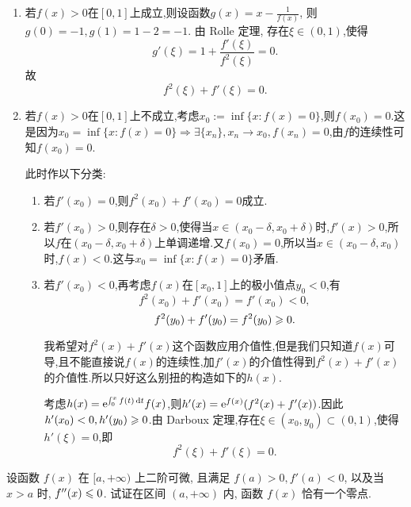 \begin{solution}

    \begin{enumerate}
        \item 若$f(x) > 0$在$[0,1]$上成立,则设函数$g(x) = x - \frac{1}{f(x)}$, 则$g(0) = -1, g(1) = 1 - 2 = -1$. 由 Rolle 定理, 存在$\xi \in (0,1)$,使得
              $$g'(\xi) = 1 + \frac{f'(\xi)}{f^2(\xi)} = 0.$$
              故
              $$f^2(\xi) + f'(\xi) = 0.$$
        \item 若$f(x) > 0 $在$[0,1]$上不成立,考虑$x_0:=\inf\{x:f(x)=0\}$,则$f(x_0) = 0$.这是因为$x_0 = \inf\{x:f(x)=0\} \Rightarrow \exists \{x_n\},x_n \to x_0,f(x_n) = 0$,由$f$的连续性可知$f(x_0) = 0$.

              此时作以下分类:
              \begin{enumerate}
                  \item 若$f'(x_0) = 0$,则$f^2(x_0) + f'(x_0) = 0$成立.
                  \item 若$f'(x_0) > 0 $,则存在$\delta > 0$,使得当$x \in (x_0 - \delta, x_0 + \delta)$时,$f'(x) > 0$,所以$f$在$(x_0 - \delta, x_0 + \delta)$上单调递增.又$f(x_0) = 0$,所以当$x \in (x_0 - \delta, x_0)$时,$f(x) < 0$.这与$x_0 = \inf\{x:f(x)=0\}$矛盾.
                  \item 若$f'(x_0) < 0 $,再考虑$f(x)$在$[x_0,1]$上的极小值点$y_0<0$,有
                        $$f^2(x_0) + f'(x_0) = f'(x_0) < 0,$$
                        $$f^2(y_0) + f'(y_0) = f^2(y_0) \geqslant 0.$$
                        \begin{remark}
                            我希望对$f^2(x) + f'(x)$这个函数应用介值性,但是我们只知道$f(x)$可导,且不能直接说$f(x)$的连续性,加$f'(x)$的介值性得到$f^2(x) + f'(x)$的介值性.所以只好这么别扭的构造如下的$h(x)$.
                        \end{remark}

                        考虑$h(x) = \mathrm{e}^{\int_0^x f(t) \operatorname{d\!} t}f(x)$,则$h'(x) = \mathrm{e}^{f(x)}(f^2(x) + f'(x))$.因此$h'(x_0) < 0,h'(y_0) \geqslant 0$.由 Darboux 定理,存在$\xi \in (x_0,y_0) \subset (0,1)$,使得$h'(\xi) = 0$,即
                        $$f^2(\xi) + f'(\xi) = 0.$$
              \end{enumerate}
    \end{enumerate}
\end{solution}

\begin{exercise}[3.C.9]
    设函数 $f(x)$ 在 $[a, +\infty)$ 上二阶可微, 且满足 $f(a) > 0, f'(a) < 0$, 以及当 $x > a$ 时, $f''(x) \leqslant 0$. 试证在区间 $(a, +\infty)$ 内, 函数 $f(x)$ 恰有一个零点.
\end{exercise}

